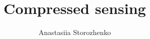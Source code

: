 \documentclass[12pt]{article}
\title{Compressed sensing}
\author{Anastasiia Storozhenko}
\theoremstyle{definition}
\theoremstyle{remark}
\theoremstyle{remark}
\numberwithin{equation}{section}
\begin{document}
    \maketitle

%

\listoftodos










%

    \nocite{*}
\printbibliography
\end{document}
